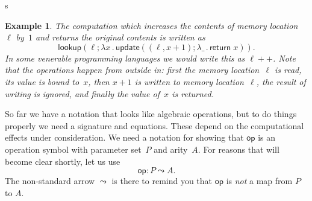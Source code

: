 s\documentclass{amsart}
\newcommand{\lam}[1]{\lambda #1 \,.\,}
\newcommand{\opdecl}[3]{#1 : #2 \leadsto #3} %
\newcommand{\kode}[1]{\mathsf{#1}}
\newcommand{\opcall}[3]{\kode{#1}(#2; #3)}
\newcommand{\return}[1]{\kode{return}\;#1}
\newtheorem{example}[definition]{Example}
\begin{document}
\begin{example}
  The computation which increases the contents of memory location~$\ell$ by~$1$
  and returns the original contents is written as
  \begin{equation*}
    \opcall{lookup}{\ell}{
    \lam{x} \opcall{update}{(\ell,x + 1)}{
    \lam{\_} \return{x}
    }
    }.
  \end{equation*}
  In some venerable programming languages we would write this as $\ell{+}{+}$.
  Note that the operations happen from outside in: first the memory
  location~$\ell$ is read, its value is bound to~$x$, then $x + 1$ is written to
  memory location~$\ell$, the result of writing is ignored, and finally the
  value of~$x$ is returned.
\end{example}

So far we have a notation that looks like algebraic operations, but to do things
properly we need a signature and equations. These depend on the computational
effects under consideration. We need a notation for showing that $\kode{op}$ is an operation symbol
with parameter set~$P$ and arity~$A$. For reasons that will become clear shortly, let us use
%
\begin{equation*}
  \opdecl{\kode{op}}{P}{A}.
\end{equation*}
%
The non-standard arrow $\leadsto$ is there to remind you that $\kode{op}$ is
\emph{not} a map from $P$ to $A$.
\end{document}
